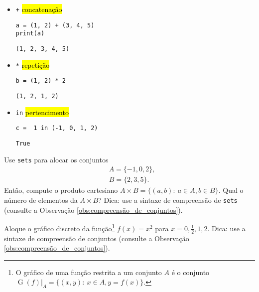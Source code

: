 \documentclass[12pt]{article}
\begin{document}
\begin{itemize}
\item[] \lstinline-+- \hl{concatenação}

\begin{lstlisting}
a = (1, 2) + (3, 4, 5)
print(a)
\end{lstlisting}

\begin{verbatim}
(1, 2, 3, 4, 5)
\end{verbatim}

\item[] \lstinline+*+ \hl{repetição}

\begin{lstlisting}
b = (1, 2) * 2
\end{lstlisting}

\begin{verbatim}
(1, 2, 1, 2)
\end{verbatim}

\item[] \lstinline+in+ \hl{pertencimento}

\begin{lstlisting}
c =  1 in (-1, 0, 1, 2)
\end{lstlisting}

\begin{verbatim}
True
\end{verbatim}

\end{itemize}

\begin{exr}
  Use \texttt{sets} para alocar os conjuntos
  \begin{align}
    &A = \{-1, 0, 2\},\\
    &B = \{2, 3, 5\}.
  \end{align}
  Então, compute o produto cartesiano $A\times B=\{(a,b):~a\in A, b\in B\}$. Qual o número de elementos da $A\times B$? Dica: use a sintaxe de compreensão de \texttt{sets} (consulte a Observação \ref{obs:compreensão_de_conjuntos}).
\end{exr}

\begin{exr}
  Aloque o gráfico discreto da função\footnote{O gráfico de uma função restrita a um conjunto $A$ é o conjunto $\operatorname{G}(f)|_{A} = \{(x,y):~x\in A, y=f(x)\}$.} $f(x) = x^2$ para $x=0, \frac{1}{2}, 1, 2$. Dica: use a sintaxe de compreensão de conjuntos (consulte a Observação \ref{obs:compreensão_de_conjuntos}).
\end{exr}
\end{document}
